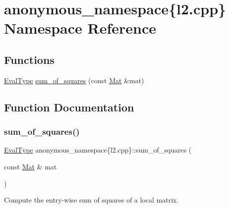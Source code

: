\hypertarget{namespaceanonymous__namespace_02l2_8cpp_03}{}\section{anonymous\+\_\+namespace\{l2.\+cpp\} Namespace Reference}
\label{namespaceanonymous__namespace_02l2_8cpp_03}
\subsection*{Functions}
\begin{DoxyCompactItemize}
\item 
\hyperlink{base_8hpp_a3266f5ac18504bbadea983c109566867}{Eval\+Type} \hyperlink{namespaceanonymous__namespace_02l2_8cpp_03_a32724e48048319cd99337131ba70d4c4}{sum\+\_\+of\+\_\+squares} (const \hyperlink{base_8hpp_a68f11fdc31b62516cb310831bbe54d73}{Mat} \&mat)
\end{DoxyCompactItemize}


\subsection{Function Documentation}
\mbox{\label{namespaceanonymous__namespace_02l2_8cpp_03_a32724e48048319cd99337131ba70d4c4}} 
\subsubsection{\texorpdfstring{sum\+\_\+of\+\_\+squares()}{sum\_of\_squares()}}
{\footnotesize\ttfamily \hyperlink{base_8hpp_a3266f5ac18504bbadea983c109566867}{Eval\+Type} anonymous\+\_\+namespace\{l2.\+cpp\}\+::sum\+\_\+of\+\_\+squares (\begin{DoxyParamCaption}\item[{const \hyperlink{base_8hpp_a68f11fdc31b62516cb310831bbe54d73}{Mat} \&}]{mat }\end{DoxyParamCaption})}

Compute the entry-\/wise sum of squares of a local matrix. 

